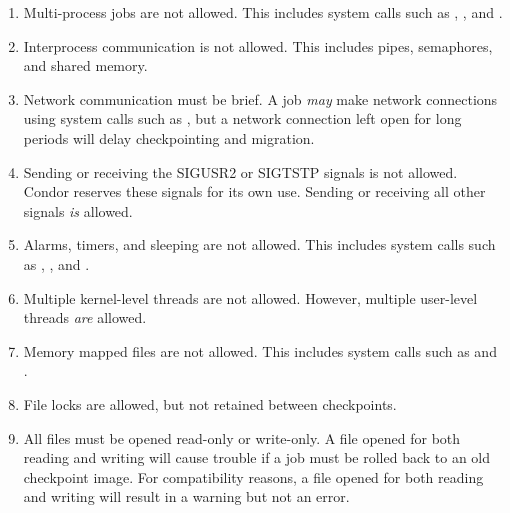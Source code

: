 
\begin{enumerate}

\item Multi-process jobs are not allowed.  This includes system calls such as
, , and .

\item Interprocess communication is not allowed.  This includes pipes, semaphores, and shared memory.

\item Network communication must be brief.  A job \emph{may} make network
connections using system calls such as , but a network
connection left open for long periods will delay checkpointing and migration.

\item Sending or receiving the SIGUSR2 or SIGTSTP signals is not allowed.
Condor reserves these signals for its own use.  Sending or receiving all
other signals \emph{is} allowed.

\item Alarms, timers, and sleeping are not allowed.  This includes system
calls such as , , and .

\item Multiple kernel-level threads are not allowed.  However,
multiple user-level threads \emph{are} allowed.

\item Memory mapped files are not allowed.  This includes system calls such
as  and .

\item File locks are allowed, but not retained between checkpoints.

\item All files must be opened read-only or write-only.  A file opened
for both reading and writing will cause trouble if a job must be rolled back
to an old checkpoint image.  For compatibility reasons, a file opened
for both reading and writing will result in a warning but not an error.


\end{enumerate}
